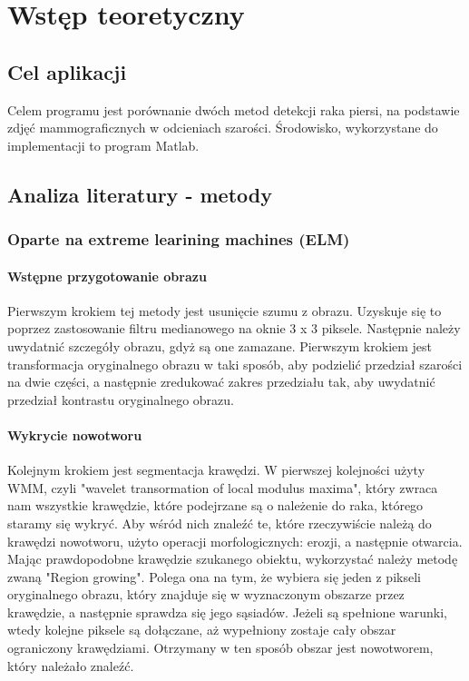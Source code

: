 \documentclass[11pt,openany]{sprawozdanie-agh}
\begin{document}

\stronatytulowa{}

\tableofcontents

\clearpage

\section{Wstęp teoretyczny}
\subsection{Cel aplikacji}
Celem programu jest porównanie dwóch metod detekcji raka piersi, na podstawie zdjęć mammograficznych w odcieniach szarości. Środowisko, wykorzystane do implementacji to program Matlab.

\subsection{Analiza literatury - metody}
\subsubsection{Oparte na extreme learining machines (ELM)}
\paragraph{Wstępne przygotowanie obrazu\\}
Pierwszym krokiem tej metody jest usunięcie szumu z obrazu. Uzyskuje się to poprzez zastosowanie filtru medianowego na oknie 3 x 3 piksele. 
Następnie należy uwydatnić szczegóły obrazu, gdyż są one zamazane. Pierwszym krokiem jest transformacja oryginalnego obrazu w taki sposób, aby podzielić przedział szarości na dwie części, a następnie zredukować zakres przedziału tak, aby uwydatnić przedział kontrastu oryginalnego obrazu.

\paragraph{Wykrycie nowotworu\\}
Kolejnym krokiem jest segmentacja krawędzi. W pierwszej kolejności użyty WMM, czyli "wavelet transormation of local modulus maxima", który zwraca nam wszystkie krawędzie, które podejrzane są o należenie do raka, którego staramy się wykryć. Aby wśród nich znaleźć te, które rzeczywiście należą do krawędzi nowotworu, użyto operacji morfologicznych: erozji, a następnie otwarcia. Mając prawdopodobne krawędzie szukanego obiektu, wykorzystać należy metodę zwaną "Region growing". Polega ona na tym, że wybiera się jeden z pikseli oryginalnego obrazu, który znajduje się w wyznaczonym obszarze przez krawędzie, a następnie sprawdza się jego sąsiadów. Jeżeli są spełnione warunki, wtedy kolejne piksele są dołączane, aż wypełniony zostaje cały obszar ograniczony krawędziami. Otrzymany w ten sposób obszar jest nowotworem, który należało znaleźć.
\end{document}
